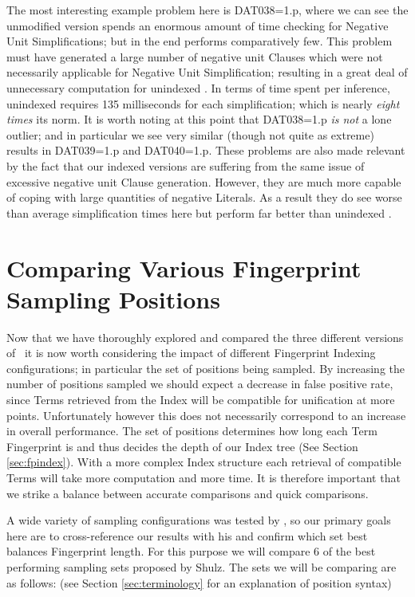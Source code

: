The most interesting example problem here is DAT038=1.p, where we can see the unmodified
version spends an enormous amount of time checking for Negative Unit Simplifications;
but in the end performs comparatively few. This problem must have generated a large
number of negative unit Clauses which were not necessarily applicable for
Negative Unit Simplification; resulting in a great deal of unnecessary computation
for unindexed \beagle. In terms of time spent per inference, 
unindexed \beagle requires 135 milliseconds for each simplification;
which is nearly \emph{eight times} its norm. It is worth noting at this point that DAT038=1.p \emph{is not} a lone outlier; and
in particular we see very similar (though not quite as extreme) results in DAT039=1.p and DAT040=1.p.
These problems are also made relevant by the fact that our indexed versions are suffering
from the same issue of excessive negative unit Clause generation.
However, they are much more capable of coping with large quantities of negative Literals.
As a result they do see worse than average simplification times here but perform
far better than unindexed \beagle. 

\section{Comparing Various Fingerprint Sampling Positions}

Now that we have thoroughly explored and compared the three different versions of
\beagle\ it is now worth considering the impact of different Fingerprint Indexing
configurations; in particular the set of positions being sampled. 
By increasing the number of positions sampled we should
expect a decrease in false positive rate, since Terms retrieved from the Index will
be compatible for unification at more points. Unfortunately however this does
not necessarily correspond to an increase in overall performance.
The set of positions determines how long each Term Fingerprint is and thus decides the depth of our Index
tree (See Section \ref{sec:fpindex}). With a more complex Index structure each
retrieval of compatible Terms will take more computation and more time. It is
therefore important that we strike a balance between accurate comparisons and
quick comparisons.

A wide variety
of sampling configurations was tested by , so our primary goals
here are to cross-reference our results with his and confirm which set best balances Fingerprint length.
For this purpose we will compare 6 of the best performing sampling sets proposed by
Shulz. The sets we will be comparing are as follows: (see Section \ref{sec:terminology}
for an explanation of position syntax)

